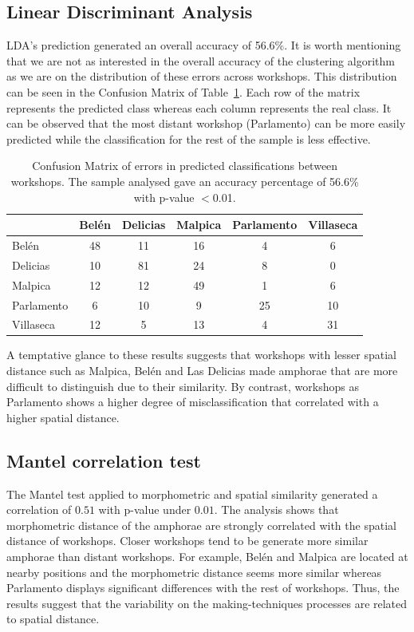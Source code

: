 \documentclass[review]{elsarticle}
\begin{document}
\subsection{Linear Discriminant Analysis}

LDA's prediction generated an overall accuracy of 56.6\%. It is worth mentioning that we are not as interested in the overall accuracy of the clustering algorithm as we are on the distribution of these errors across workshops. This distribution can be seen in the Confusion Matrix of Table~\ref{table:confusion}. Each row of the matrix represents the predicted class whereas each column represents the real class. It can be observed that the most distant workshop (Parlamento) can be more easily predicted while the classification for the rest of the sample is less effective.

\begin{table}[htp]
\begin{tabular}{lccccc}
\hline
      & Belén & Delicias & Malpica & Parlamento & Villaseca\\ \hline
Belén & 48 & 11 & 16 & 4 & 6 \\
Delicias & 10 & 81 & 24 & 8 & 0 \\
Malpica & 12 & 12 & 49 & 1 & 6 \\
Parlamento & 6 & 10 & 9 & 25 & 10 \\
Villaseca & 12 & 5 & 13 & 4 & 31 \\
\hline

\end{tabular}
\caption{Confusion Matrix of errors in predicted classifications between workshops. The sample analysed gave an accuracy percentage of 56.6\% with p-value $<$0.01. }
\label{table:confusion}
\end{table}

A temptative glance to these results suggests that workshops with lesser spatial distance such as Malpica, Belén and Las Delicias made amphorae that are more difficult to distinguish due to their similarity. By contrast, workshops as Parlamento shows a higher degree of misclassification that correlated with a higher spatial distance. 

\subsection{Mantel correlation test}

The Mantel test applied to morphometric and spatial similarity generated a correlation of $0.51$ with p-value under $0.01$. The analysis shows that morphometric distance of the amphorae are strongly correlated with the spatial distance of workshops. Closer workshops tend to be generate more similar amphorae than distant workshops. For example, Belén and Malpica are located at nearby positions and the morphometric distance seems more similar whereas Parlamento displays significant differences with the rest of workshops. Thus, the results suggest that the variability on the making-techniques processes are related to spatial distance.
\end{document}
